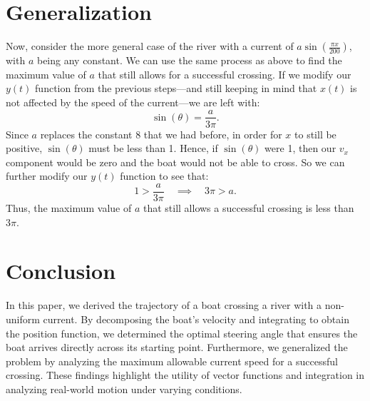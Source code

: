 \documentclass{article}
\begin{document}
\section{Generalization}

Now, consider the more general case of the river with a current of \(a\sin(\frac{\pi x}{200})\), with \(a\) being any constant. We can use the same process as above to find the maximum value of \(a\) that still allows for a successful crossing. If we modify our \(y(t)\) function from the previous steps---and still keeping in mind that \(x(t)\) is not affected by the speed of the current---we are left with:
\[
  \sin(\theta) = \frac{a}{3\pi}.
\]
Since \(a\) replaces the constant 8 that we had before, in order for \(x\) to still be positive, \(\sin(\theta)\) must be less than 1. Hence, if \(\sin(\theta)\) were 1, then our \(v_x\) component would be zero and the boat would not be able to cross. So we can further modify our \(y(t)\) function to see that:
\[
  1 > \frac{a}{3\pi} \quad \implies \quad 3\pi > a. 
\]
Thus, the maximum value of \(a\) that still allows a successful crossing is less than \(3\pi\).

\section{Conclusion}

In this paper, we derived the trajectory of a boat crossing a river with a non-uniform current. By decomposing the boat's velocity and integrating to obtain the position function, we determined the optimal steering angle that ensures the boat arrives directly across its starting point. Furthermore, we generalized the problem by analyzing the maximum allowable current speed for a successful crossing. These findings highlight the utility of vector functions and integration in analyzing real-world motion under varying conditions.
\end{document}
